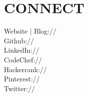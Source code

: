 \documentclass[]{resume-openfont}
\begin{document}
\begin{minipage}[t]{0.28\textwidth}

\section{CONNECT}
Website | Blog:// \href{https://diksha-rathi.github.io}{} \\
Github:// \href{https://github.com/Diksha-Rathi}{} \\
LinkedIn://  \href{https://www.linkedin.com/in/diksharathi}{} \\
CodeChef://  \href{https://www.codechef.com/users/codegirl1995}{} \\
Hackerrank://  \href{https://www.hackerrank.com/codegirl1995}{} \\
Pinterest:// \href{https://in.pinterest.com/diksha2895/}{} \\
Twitter://  \href{https://twitter.com/diksha_28795}{} \\

%
%

\end{minipage} 
\hfill
\end{document}
